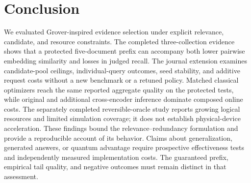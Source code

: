 \section{Conclusion}\label{sec:conclusion}
We evaluated Grover-inspired evidence selection under explicit relevance, candidate, and resource constraints. The completed three-collection evidence shows that a protected five-document prefix can accompany both lower pairwise embedding similarity and losses in judged recall. The journal extension examines candidate-pool ceilings, individual-query outcomes, seed stability, and additive request costs without a new benchmark or a retuned policy. Matched classical optimizers reach the same reported aggregate quality on the protected tests, while original and additional cross-encoder inference dominate composed online costs. The separately completed reversible-oracle study reports growing logical resources and limited simulation coverage; it does not establish physical-device acceleration. These findings bound the relevance--redundancy formulation and provide a reproducible account of its behavior. Claims about generalization, generated answers, or quantum advantage require prospective effectiveness tests and independently measured implementation costs. The guaranteed prefix, empirical tail quality, and negative outcomes must remain distinct in that assessment.
